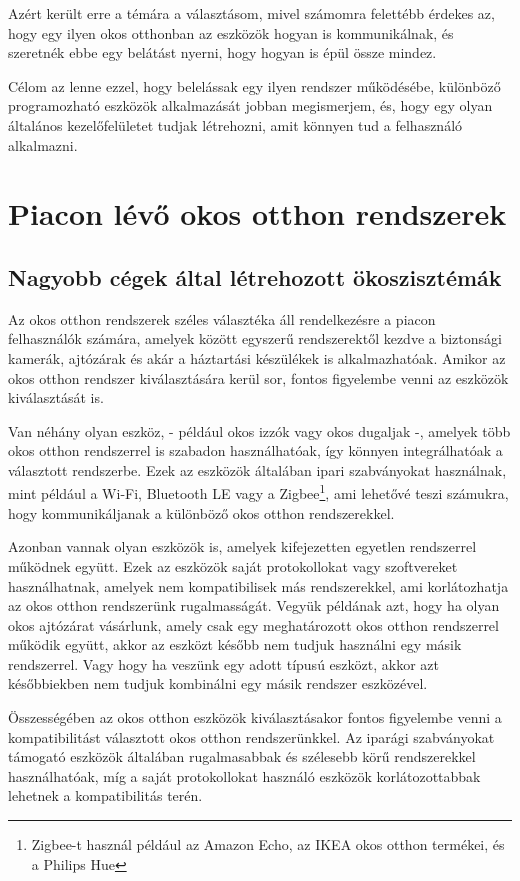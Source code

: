 \documentclass[
]{thesis-ekf}
\theoremstyle{definition}
\theoremstyle{remark}
\begin{document}
	Azért került erre a témára a választásom, mivel számomra felettébb érdekes az, hogy egy ilyen okos otthonban az eszközök hogyan is kommunikálnak, és szeretnék ebbe egy belátást nyerni, hogy hogyan is épül össze mindez.

	Célom az lenne ezzel, hogy belelássak egy ilyen rendszer működésébe, különböző programozható eszközök alkalmazását jobban megismerjem, és, hogy egy olyan általános kezelőfelületet tudjak létrehozni, amit könnyen tud a felhasználó alkalmazni.
	
	\chapter{Piacon lévő okos otthon rendszerek}
	\section{Nagyobb cégek által létrehozott ökoszisztémák}
	Az okos otthon rendszerek széles választéka áll rendelkezésre a piacon felhasználók számára, amelyek között egyszerű rendszerektől kezdve a biztonsági kamerák, ajtózárak és akár a háztartási készülékek is alkalmazhatóak. Amikor az okos otthon rendszer kiválasztására kerül sor, fontos figyelembe venni az eszközök kiválasztását is.
	
	Van néhány olyan eszköz, - például okos izzók vagy okos dugaljak -, amelyek több okos otthon rendszerrel is szabadon használhatóak, így könnyen integrálhatóak a választott rendszerbe. Ezek az eszközök általában ipari szabványokat használnak, mint például a Wi-Fi, Bluetooth LE vagy a Zigbee\footnote{Zigbee-t használ például az Amazon Echo, az IKEA okos otthon termékei, és a Philips Hue}, ami lehetővé teszi számukra, hogy kommunikáljanak a különböző okos otthon rendszerekkel. 
	
	Azonban vannak olyan eszközök is, amelyek kifejezetten egyetlen rendszerrel működnek együtt. Ezek az eszközök saját protokollokat vagy szoftvereket használhatnak, amelyek nem kompatibilisek más rendszerekkel, ami korlátozhatja az okos otthon rendszerünk rugalmasságát. Vegyük példának azt, hogy ha olyan okos ajtózárat vásárlunk, amely csak egy meghatározott okos otthon rendszerrel működik együtt, akkor az eszközt később nem tudjuk használni egy másik rendszerrel. Vagy hogy ha veszünk egy adott típusú eszközt, akkor azt későbbiekben nem tudjuk kombinálni egy másik rendszer eszközével.
	
	Összességében az okos otthon eszközök kiválasztásakor fontos figyelembe venni a kompatibilitást választott okos otthon rendszerünkkel. Az iparági szabványokat támogató eszközök általában rugalmasabbak és szélesebb körű rendszerekkel használhatóak, míg a saját protokollokat használó eszközök korlátozottabbak lehetnek a kompatibilitás terén.
		
\end{document}
